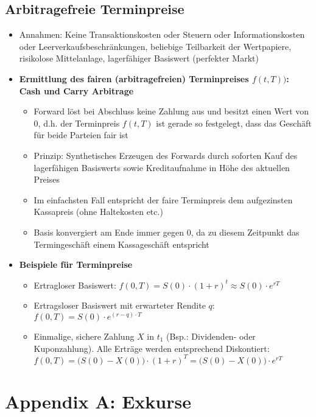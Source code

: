 \subsection{Arbitragefreie Terminpreise}
\begin{itemize}
	\item Annahmen: Keine Transaktionskosten oder Steuern oder Informationskosten oder Leerverkaufsbeschränkungen, beliebige Teilbarkeit der Wertpapiere, risikolose Mittelanlage, lagerfähiger Basiswert (perfekter Markt)
	\item \textbf{Ermittlung des fairen (arbitragefreien) Terminpreises \(f(t,T))\): Cash und Carry Arbitrage}
	\begin{itemize}
		\item Forward löst bei Abschluss keine Zahlung aus und besitzt einen Wert von \(0\), d.h. der Terminpreis \(f(t,T)\) ist gerade so festgelegt, dass das Geschäft für beide Parteien fair ist
		\item Prinzip: Synthetisches Erzeugen des Forwards durch soforten Kauf des lagerfähigen Basiswerts sowie Kreditaufnahme in Höhe des aktuellen Preises
		\item Im einfachsten Fall entspricht der faire Terminpreis dem aufgezinsten Kassapreis (ohne Haltekosten etc.)
		\item Basis konvergiert am Ende immer gegen \(0\), da zu diesem Zeitpunkt das Termingeschäft einem Kassageschäft entspricht
	\end{itemize}
	\item \textbf{Beispiele für Terminpreise}
	\begin{itemize}
		\item Ertragloser Basiswert: \(f(0,T) = S(0)\cdot(1+r)^t \approx S(0) \cdot e^{rT}\)
		\item Ertragsloser Basiswert mit erwarteter Rendite \(q\): \(f(0,T) = S(0) \cdot e^{(r-q)\cdot T}\)
		\item Einmalige, sichere Zahlung \(X\) in \(t_1\) (Bsp.: Dividenden- oder Kuponzahlung). Alle Erträge werden entsprechend Diskontiert: \(f(0,T) = \big(S(0)-X(0)\big)\cdot (1+r)^T = \big(S(0)-X(0)\big)\cdot e^{rT}\)
	\end{itemize}
\end{itemize}



\section{Appendix A: Exkurse}

